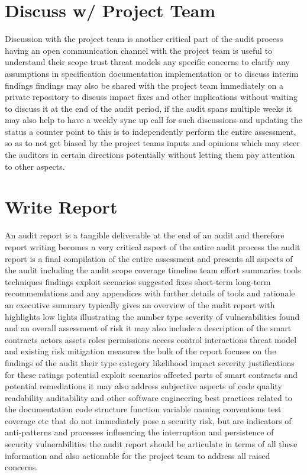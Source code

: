 \section{Discuss w/ Project Team}

Discussion with the project team is another critical part of the audit process having an open communication channel with the project team is useful to understand their scope trust threat models any specific concerns to clarify any assumptions in specification documentation implementation or to discuss interim findings findings may also be shared with the project team immediately on a private repository to discuss impact fixes and other implications without waiting to discuss it at the end of the audit period, if the audit spans multiple weeks it may also help to have a weekly sync up call for such discussions and updating the status a counter point to this is to independently perform the entire assessment, so as to not get biased by the project teams inputs and opinions which may steer the auditors in certain directions potentially without letting them pay attention to other aspects.

\section{Write Report}

An audit report is a tangible deliverable at the end of an audit and therefore report writing becomes a very critical aspect of the entire audit process the audit report is a final compilation of the entire assessment and presents all aspects of the audit including the audit scope coverage timeline team effort summaries tools techniques findings exploit scenarios suggested fixes short-term long-term recommendations and any appendices with further details of tools and rationale an executive summary typically gives an overview of the audit report with highlights low lights illustrating the number type severity of vulnerabilities found and an overall assessment of risk it may also include a description of the smart contracts actors assets roles permissions access control interactions threat model and existing risk mitigation measures the bulk of the report focuses on the findings of the audit their type category likelihood impact severity justifications for these ratings potential exploit scenarios affected parts of smart contracts and potential remediations it may also address subjective aspects of code quality readability auditability and other software engineering best practices related to the documentation code structure function variable naming conventions test coverage etc that do not immediately pose a security risk, but are indicators of anti-patterns and processes influencing the interruption and persistence of security vulnerabilities the audit report should be articulate in terms of all these information and also actionable for the project team to address all raised concerns.

